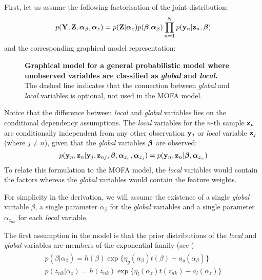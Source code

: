First, let us assume the following factorisation of the joint distribution:
\begin{equation}
	p({\bf Y}, {\bf Z}, \mbox{\boldmath $\alpha$}_{\beta}, \mbox{\boldmath $\alpha$}_{z}) = p({\bf Z}|\mbox{\boldmath $\alpha$}_{z}) p(\mbox{\boldmath $\beta$}|\mbox{\boldmath $\alpha$}_{\beta}) \prod_{n=1}^{N} p({\bf y}_{n}|{\bf z}_{n},\mbox{\boldmath $\beta$})
\end{equation}
and the corresponding graphical model representation:
\begin{figure}[H]
	\centering	
	
	\caption{\textbf{Graphical model for a general probabilistic model where unobserved variables are classified as \textit{global} and \textit{local}.}\\
	The dashed line indicates that the connection between \textit{global} and \textit{local} variables is optional, not used in the MOFA model.
	}
	\label{fig:graphical_model_stochastic}
\end{figure}

Notice that the difference between \textit{local} and \textit{global} variables lies on the conditional dependency assumptions. The \textit{local} variables for the $n$-th sample ${\bf z}_n$ are conditionally independent from any other observation ${\bf y}_{j}$ or \textit{local} variable ${\bf z}_{j}$ (where $j \neq n$), given that the \textit{global} variables $\mbox{\boldmath $\beta$}$ are observed:
\[
	p({\bf y}_n,{\bf z}_n| {\bf y}_j,{\bf z}_{nj},\mbox{\boldmath $\beta$},\mbox{\boldmath $\alpha$}_{z_{n}},\mbox{\boldmath $\alpha$}_{z_{j}}) = p({\bf y}_n,{\bf z}_n|\mbox{\boldmath $\beta$},\mbox{\boldmath $\alpha$}_{z_{n}})
\]
To relate this formulation to the MOFA model, the \textit{local} variables would contain the factors whereas the \textit{global} variables would contain the feature weights.

For simplicity in the derivation, we will assume the existence of a single \textit{global} variable $\beta$, a single parameter $\alpha_{\beta}$ for the \textit{global} variables and a single parameter $\alpha_{z_{nk}}$ for each \textit{local} variable.

The first assumption in the model is that the prior distributions of the \textit{local} and \textit{global} variables are members of the exponential family (see )
\begin{align} \label{eq_priors} 
	\begin{split}
	p(\beta|\alpha_{\beta}) = h(\beta) \exp\{ \eta_g(\alpha_{\beta}) t(\beta) - a_g(\alpha_{\beta}) \} \\
	p(z_{nk}|\alpha_{z}) = h(z_{nk}) \exp\{ \eta_l(\alpha_{z}) t(z_{nk}) - a_l(\alpha_{z}) \}
	\end{split} 
\end{align}

